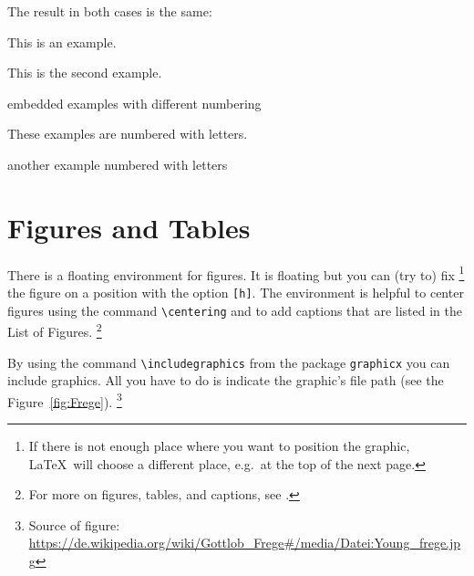 The result in both cases is the same:

\ea This is an example.

\ex This is the second example.

	\ea embedded examples with different numbering
	
	\ex These examples are numbered with letters.
	
	\ex another example numbered with letters
	\z   
\z


\section{Figures and Tables}
\label{ch:FigTab}


There is a floating environment for figures. It is floating but you can (try to) fix%
	\footnote{If there is not enough place where you want to position the graphic, \LaTeX\ will choose a different place, e.g.\ at the top of the next page.} %
the figure on a position with the option \texttt{[h]}. The environment is helpful to center figures using the command \verb|\centering| and to add captions that are listed in the List of Figures.%
	\footnote{For more on figures, tables, and captions, see \citet{Freitag&MyP15a}.} %

By using the command \verb|\includegraphics| from the package \texttt{graphicx} you can include graphics. All you have to do is indicate the graphic's file path (see the Figure~\ref{fig:Frege}).%
	\footnote{Source of figure: \href{https://de.wikipedia.org/wiki/Gottlob\_Frege\#/media/Datei:Young\_frege.jpg}{https://de.wikipedia.org/wiki/Gottlob\_Frege\#/media/Datei:Young\_frege.jpg}}%



